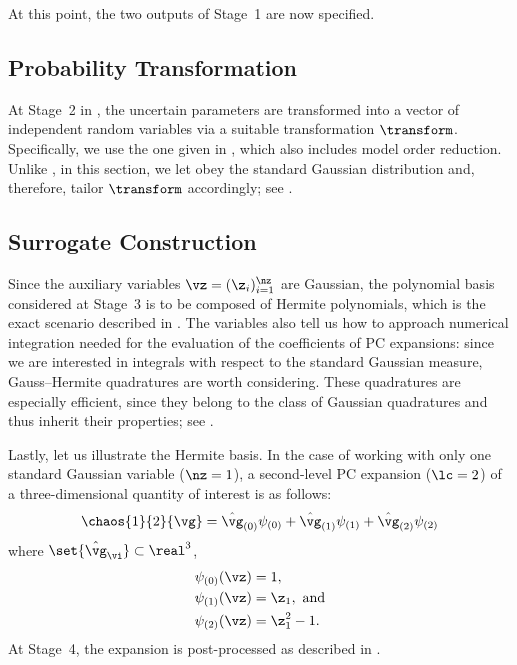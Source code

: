 At this point, the two outputs of Stage~1 are now specified.

\subsection{Probability Transformation}

At Stage~2 in , the uncertain parameters \vu are
transformed into a vector of independent random variables \vz via a suitable
transformation $\transform$. Specifically, we use the one given in
, which also includes model order reduction.
Unlike , in this section, we let \vz obey the
standard Gaussian distribution and, therefore, tailor $\transform$ accordingly;
see .

\subsection{Surrogate Construction}

Since the auxiliary variables $\vz = (\z_i)_{i = 1}^\nz$ are Gaussian, the
polynomial basis considered at Stage~3 is to be composed of Hermite polynomials,
which is the exact scenario described in . The variables
also tell us how to approach numerical integration needed for the evaluation of
the coefficients of \ac{PC} expansions: since we are interested in integrals
with respect to the standard Gaussian measure, Gauss--Hermite quadratures
\cite{maitre2010} are worth considering. These quadratures are especially
efficient, since they belong to the class of Gaussian quadratures and thus
inherit their properties; see .

Lastly, let us illustrate the Hermite basis. In the case of working with only
one standard Gaussian variable ($\nz = 1$), a second-level \ac{PC} expansion
($\lc = 2$) of a three-dimensional quantity of interest \vg is as follows:
\[
  \chaos{1}{2}{\vg}
  = \hat{\vg}_{(0)} \psi_{(0)}
  + \hat{\vg}_{(1)} \psi_{(1)}
  + \hat{\vg}_{(2)} \psi_{(2)}
\]
where $\set{\hat{\vg}_{\vi}} \subset \real^3$,
\begin{align*}
  & \psi_{(0)}(\vz) = 1, \\
  & \psi_{(1)}(\vz) = \z_1, \text{ and} \\
  & \psi_{(2)}(\vz) = \z_1^2 - 1.
\end{align*}
At Stage~4, the expansion is post-processed as described in
.
